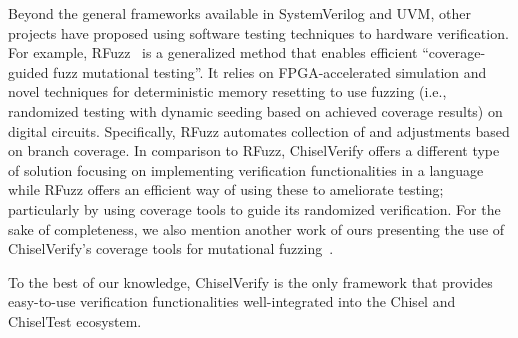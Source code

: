 \documentclass[conference]{IEEEtran}
\begin{document}

Beyond the general frameworks available in SystemVerilog and UVM, other projects have proposed 
using software testing techniques to hardware verification. For example, RFuzz~\cite{rfuzz2018} 
is a generalized method that enables efficient ``coverage-guided fuzz mutational testing''. 
It relies on FPGA-accelerated simulation and novel techniques for deterministic memory 
resetting to use fuzzing (i.e., randomized testing with dynamic seeding based on achieved 
coverage results) on digital circuits. Specifically, RFuzz automates collection of and adjustments 
based on branch coverage. In comparison to RFuzz, ChiselVerify offers a different type 
of solution focusing on implementing verification functionalities in a language while 
RFuzz offers an efficient way of using these to ameliorate testing; particularly by using coverage 
tools to guide its randomized verification. For the sake of completeness, we also mention another 
work of ours presenting the use of ChiselVerify's coverage tools for mutational 
fuzzing~\cite{verify:fuzzing:2021}.


To the best of our knowledge, ChiselVerify is the only framework that provides easy-to-use verification functionalities well-integrated into the Chisel and ChiselTest ecosystem.
\end{document}
